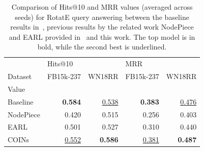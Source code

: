 \begin{table}[H]
  \caption[Comparison of Hits@10 and MRR values for query answering between the RotatE baseline, NodePiece, EARL and COINs.]{Comparison of Hits@10 and MRR values (averaged across seeds) for RotatE query answering between the baseline results in~\cite{sun_rotate_2019}, previous results by the related work NodePiece and EARL provided in~\cite{chen_entity-agnostic_2023} and this work. The top model is in bold, while the second best is underlined.}
  \label{tab:performance_query_answering_related_work}
  \centering
\begin{tabular}{lrrrr}
\toprule
{} & \multicolumn{2}{l}{Hits@10} & \multicolumn{2}{l}{MRR} \\
Dataset & FB15k-237 & WN18RR & FB15k-237 & WN18RR \\
Value     &           &        &           &        \\
\midrule
Baseline  &     \textbf{0.584} &  \underline{0.538} &  \textbf{0.383} &  \underline{0.476} \\
NodePiece &     0.420 &  0.515 &     0.256 &  0.403 \\
EARL      &     0.501 &  0.527 &     0.310 &  0.440 \\
COINs     &     \underline{0.552} &  \textbf{0.586} &     \underline{0.381} &  \textbf{0.487} \\
\bottomrule
\end{tabular}
\end{table}

